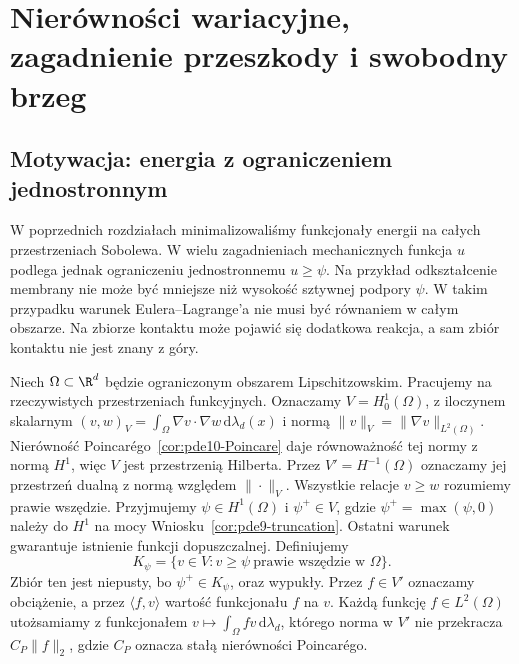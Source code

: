 \chapter[Nierówności wariacyjne i przeszkoda]{Nierówności wariacyjne, zagadnienie przeszkody i swobodny brzeg}
\label{chap:pde29}

\section{Motywacja: energia z ograniczeniem jednostronnym}
W poprzednich rozdziałach minimalizowaliśmy funkcjonały energii na całych
przestrzeniach Sobolewa. W wielu zagadnieniach mechanicznych funkcja
$u$ podlega jednak ograniczeniu jednostronnemu $u\ge\psi$.
Na przykład odkształcenie membrany nie może być mniejsze niż wysokość
sztywnej podpory $\psi$. W takim przypadku warunek Eulera--Lagrange'a
nie musi być równaniem w całym obszarze. Na zbiorze kontaktu może pojawić
się dodatkowa reakcja, a sam zbiór kontaktu nie jest znany z góry.

Niech $\Omega\subset\R^d$ będzie ograniczonym obszarem Lipschitzowskim.
Pracujemy na rzeczywistych przestrzeniach funkcyjnych.
Oznaczamy $V=H_0^1(\Omega)$, z iloczynem skalarnym
$(v,w)_V=\int_\Omega\nabla v\cdot\nabla w\,\mathrm d\lambda_d(x)$
i normą $\|v\|_V=\|\nabla v\|_{L^2(\Omega)}$.
Nierówność Poincarégo~\ref{cor:pde10-Poincare}
daje równoważność tej normy z normą $H^1$, więc
$V$ jest przestrzenią Hilberta.
Przez $V'=H^{-1}(\Omega)$ oznaczamy jej przestrzeń
dualną z normą względem $\|\cdot\|_V$.
Wszystkie relacje $v\ge w$ rozumiemy prawie wszędzie.
Przyjmujemy $\psi\in H^1(\Omega)$ i $\psi^+\in V$,
gdzie $\psi^+=\max(\psi,0)$ należy do $H^1$
na mocy Wniosku~\ref{cor:pde9-truncation}.
Ostatni warunek gwarantuje istnienie funkcji dopuszczalnej.
Definiujemy
\[
 K_\psi=\{v\in V:v\geq\psi\ \text{prawie wszędzie w }\Omega\}.
\]
Zbiór ten jest niepusty, bo $\psi^+\in K_\psi$, oraz wypukły.
Przez $f\in V'$ oznaczamy obciążenie, a przez
$\langle f,v\rangle$ wartość funkcjonału $f$ na $v$.
Każdą funkcję $f\in L^2(\Omega)$ utożsamiamy
z funkcjonałem $v\mapsto\int_\Omega fv\,\mathrm d\lambda_d$,
którego norma w $V'$ nie przekracza $C_P\|f\|_2$,
gdzie $C_P$ oznacza stałą nierówności Poincarégo.

